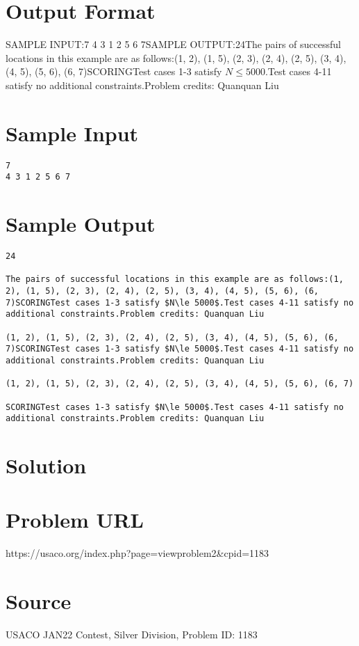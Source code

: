 \documentclass[12pt]{article}
\begin{document}
\section*{Output Format}
SAMPLE INPUT:7
4 3 1 2 5 6 7SAMPLE OUTPUT:24The pairs of successful locations in this example are as follows:(1, 2), (1, 5), (2, 3), (2, 4), (2, 5), (3, 4), (4, 5), (5, 6), (6, 7)SCORINGTest cases 1-3 satisfy $N\le 5000$.Test cases 4-11 satisfy no
additional constraints.Problem credits: Quanquan Liu

\section*{Sample Input}
\begin{verbatim}
7
4 3 1 2 5 6 7
\end{verbatim}

\section*{Sample Output}
\begin{verbatim}
24

The pairs of successful locations in this example are as follows:(1, 2), (1, 5), (2, 3), (2, 4), (2, 5), (3, 4), (4, 5), (5, 6), (6, 7)SCORINGTest cases 1-3 satisfy $N\le 5000$.Test cases 4-11 satisfy no
additional constraints.Problem credits: Quanquan Liu

(1, 2), (1, 5), (2, 3), (2, 4), (2, 5), (3, 4), (4, 5), (5, 6), (6, 7)SCORINGTest cases 1-3 satisfy $N\le 5000$.Test cases 4-11 satisfy no
additional constraints.Problem credits: Quanquan Liu

(1, 2), (1, 5), (2, 3), (2, 4), (2, 5), (3, 4), (4, 5), (5, 6), (6, 7)

SCORINGTest cases 1-3 satisfy $N\le 5000$.Test cases 4-11 satisfy no
additional constraints.Problem credits: Quanquan Liu
\end{verbatim}

\section*{Solution}


\section*{Problem URL}
https://usaco.org/index.php?page=viewproblem2&cpid=1183

\section*{Source}
USACO JAN22 Contest, Silver Division, Problem ID: 1183
\end{document}
